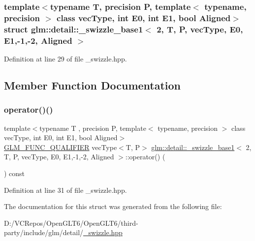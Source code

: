 \subsubsection*{template$<$typename T, precision P, template$<$ typename, precision $>$ class vec\+Type, int E0, int E1, bool Aligned$>$\newline
struct glm\+::detail\+::\+\_\+swizzle\+\_\+base1$<$ 2, T, P, vec\+Type, E0, E1,-\/1,-\/2, Aligned $>$}



Definition at line 29 of file \+\_\+swizzle.\+hpp.



\subsection{Member Function Documentation}
\mbox{\label{structglm_1_1detail_1_1__swizzle__base1_3_012_00_01_t_00_01_p_00_01vec_type_00_01_e0_00_01_e1_00-1_00-2_00_01_aligned_01_4_a08b7cb3886356b94ac68beb83e03564c}} 
\subsubsection{\texorpdfstring{operator()()}{operator()()}}
{\footnotesize\ttfamily template$<$typename T , precision P, template$<$ typename, precision $>$ class vec\+Type, int E0, int E1, bool Aligned$>$ \\
\mbox{\hyperlink{setup_8hpp_a33fdea6f91c5f834105f7415e2a64407}{G\+L\+M\+\_\+\+F\+U\+N\+C\+\_\+\+Q\+U\+A\+L\+I\+F\+I\+ER}} vec\+Type$<$T, P$>$ \mbox{\hyperlink{structglm_1_1detail_1_1__swizzle__base1}{glm\+::detail\+::\+\_\+swizzle\+\_\+base1}}$<$ 2, T, P, vec\+Type, E0, E1,-\/1,-\/2, Aligned $>$\+::operator() (\begin{DoxyParamCaption}{ }\end{DoxyParamCaption}) const\hspace{0.3cm}{\ttfamily [inline]}}



Definition at line 31 of file \+\_\+swizzle.\+hpp.



The documentation for this struct was generated from the following file\+:\begin{DoxyCompactItemize}
\item 
D\+:/\+V\+C\+Repos/\+Open\+G\+L\+T6/\+Open\+G\+L\+T6/third-\/party/include/glm/detail/\mbox{\hyperlink{__swizzle_8hpp}{\+\_\+swizzle.\+hpp}}\end{DoxyCompactItemize}

